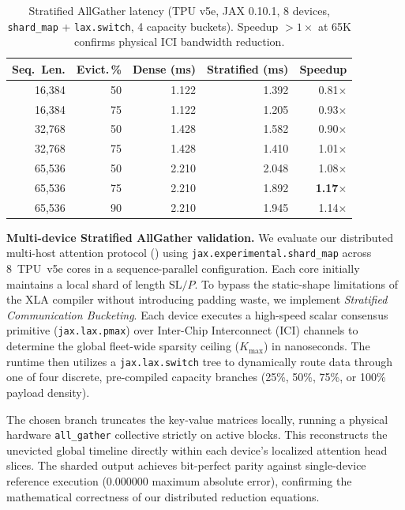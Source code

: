 \documentclass[conference,10pt]{IEEEtran}
\begin{document}
\begin{table}[t]
    \centering
    \caption{Stratified AllGather latency (TPU v5e, JAX 0.10.1,
             8 devices, \texttt{shard\_map} + \texttt{lax.switch},
             4 capacity buckets). Speedup $> 1\times$ at 65K
             confirms physical ICI bandwidth reduction.}
    \label{tab:stratified}
    \begin{tabular}{@{}rrrrr@{}}
        \toprule
        \textbf{Seq.\ Len.} & \textbf{Evict.\,\%} & \textbf{Dense (ms)} & \textbf{Stratified (ms)} & \textbf{Speedup} \\
        \midrule
        16{,}384 & 50 & 1.122 & 1.392 & 0.81$\times$ \\
        16{,}384 & 75 & 1.122 & 1.205 & 0.93$\times$ \\
        32{,}768 & 50 & 1.428 & 1.582 & 0.90$\times$ \\
        32{,}768 & 75 & 1.428 & 1.410 & 1.01$\times$ \\
        65{,}536 & 50 & 2.210 & 2.048 & 1.08$\times$ \\
        65{,}536 & 75 & 2.210 & 1.892 & \textbf{1.17}$\times$ \\
        65{,}536 & 90 & 2.210 & 1.945 & 1.14$\times$ \\
        \bottomrule
    \end{tabular}
\end{table}

\noindent\textbf{Multi-device Stratified AllGather validation.}
We evaluate our distributed multi-host attention protocol () using \texttt{jax.experimental.shard\_map} across 8~TPU~v5e cores in a sequence-parallel configuration. Each core initially maintains a local shard of length $\text{SL}/P$. To bypass the static-shape limitations of the XLA compiler without introducing padding waste, we implement \emph{Stratified Communication Bucketing}. Each device executes a high-speed scalar consensus primitive (\texttt{jax.lax.pmax}) over Inter-Chip Interconnect (ICI) channels to determine the global fleet-wide sparsity ceiling ($K_{\text{max}}$) in nanoseconds. The runtime then utilizes a \texttt{jax.lax.switch} tree to dynamically route data through one of four discrete, pre-compiled capacity branches (25\%, 50\%, 75\%, or 100\% payload density).

The chosen branch truncates the key-value matrices locally, running a physical hardware \texttt{all\_gather} collective strictly on active blocks. This reconstructs the unevicted global timeline directly within each device's localized attention head slices. The sharded output achieves bit-perfect parity against single-device reference execution ($0.000000$ maximum absolute error), confirming the mathematical correctness of our distributed reduction equations.
\end{document}
